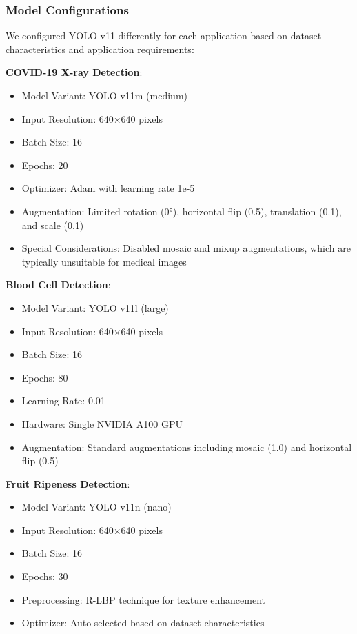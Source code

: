 \begin{multicols}{2}
\subsubsection{Model Configurations}

We configured YOLO v11 differently for each application based on dataset characteristics and application requirements:

\textbf{COVID-19 X-ray Detection}:
\begin{itemize}
    \item Model Variant: YOLO v11m (medium)
    \item Input Resolution: 640×640 pixels
    \item Batch Size: 16
    \item Epochs: 20
    \item Optimizer: Adam with learning rate 1e-5
    \item Augmentation: Limited rotation (0°), horizontal flip (0.5), translation (0.1), and scale (0.1)
    \item Special Considerations: Disabled mosaic and mixup augmentations, which are typically unsuitable for medical images
\end{itemize}

\textbf{Blood Cell Detection}:
\begin{itemize}
    \item Model Variant: YOLO v11l (large)
    \item Input Resolution: 640×640 pixels
    \item Batch Size: 16
    \item Epochs: 80
    \item Learning Rate: 0.01
    \item Hardware: Single NVIDIA A100 GPU
    \item Augmentation: Standard augmentations including mosaic (1.0) and horizontal flip (0.5)
\end{itemize}

\textbf{Fruit Ripeness Detection}:
\begin{itemize}
    \item Model Variant: YOLO v11n (nano)
    \item Input Resolution: 640×640 pixels
    \item Batch Size: 16
    \item Epochs: 30
    \item Preprocessing: R-LBP technique for texture enhancement
    \item Optimizer: Auto-selected based on dataset characteristics
\end{itemize}


\end{multicols}
